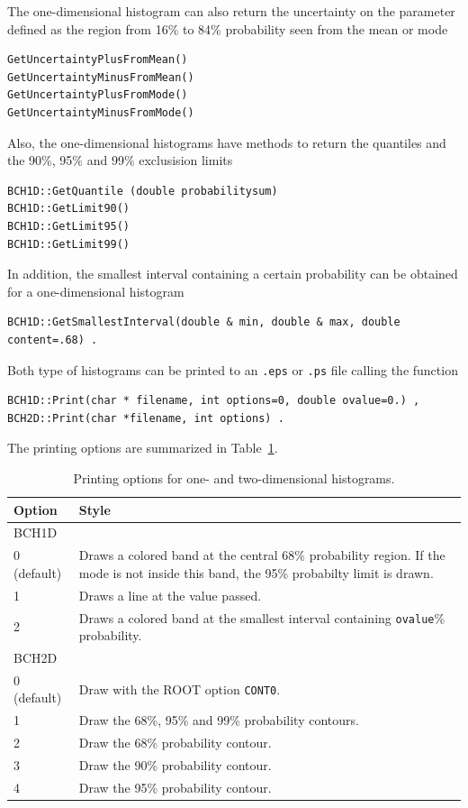 \documentclass[11pt, a4paper]{article}
\begin{document}
\noindent 
The one-dimensional histogram can also return the uncertainty on the
parameter defined as the region from 16\% to 84\% probability seen
from the mean or mode
%
\begin{verbatim}
GetUncertaintyPlusFromMean()
GetUncertaintyMinusFromMean()
GetUncertaintyPlusFromMode()
GetUncertaintyMinusFromMode()
\end{verbatim} 

\noindent 
Also, the one-dimensional histograms have methods to return the
quantiles and the 90\%, 95\% and 99\% exclusision limits
%
\begin{verbatim} 
BCH1D::GetQuantile (double probabilitysum)
BCH1D::GetLimit90()
BCH1D::GetLimit95()
BCH1D::GetLimit99()
\end{verbatim} 

\noindent 
In addition, the smallest interval containing a certain probability
can be obtained for a one-dimensional histogram 
%
\begin{verbatim}
BCH1D::GetSmallestInterval(double & min, double & max, double content=.68) . 
\end{verbatim}

\noindent 
Both type of histograms can be printed to an \verb|.eps| or \verb|.ps|
file calling the function 

\begin{verbatim}
BCH1D::Print(char * filename, int options=0, double ovalue=0.) , 
BCH2D::Print(char *filename, int options) . 
\end{verbatim}  

The printing options are summarized in Table~\ref{table:printingoptions}. 

\begin{table}[ht!]
\begin{tabular}{ll}
\hline
Option & Style \\ 
\hline
BCH1D & \\ 
\hline 
0 (default) & \begin{minipage}[l]{12 cm}Draws a colored band at the central 68\% probability region. If the mode is not inside this band, the 95\% probabilty limit is drawn. \end{minipage}\\ 
1           & Draws a line at the value passed. \\ 
2           & Draws a colored band at the smallest interval containing \verb|ovalue|\% probability. \\
\hline 
BCH2D & \\ 
\hline 
0 (default) & Draw with the ROOT option \verb|CONT0|. \\ 
1           & Draw the 68\%, 95\% and 99\% probability contours. \\ 
2           & Draw the 68\% probability contour. \\ 
3           & Draw the 90\% probability contour. \\ 
4           & Draw the 95\% probability contour. \\ 
\hline
\end{tabular}
\caption{Printing options for one- and two-dimensional histograms. 
\label{table:printingoptions}} 
\end{table}
\end{document}
